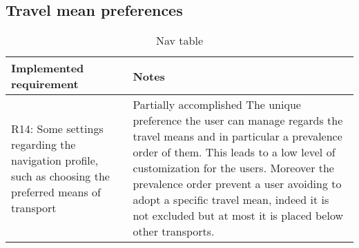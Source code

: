 \subsection{Travel mean preferences}

\begin{flushleft}
	
	\begin{table}[htp]
		
		\begin{tabular}{p{7cm}|p{7cm}}
			Implemented requirement&Notes\\
			\hline
			\hline
R14: Some settings regarding the navigation profile, such as choosing the preferred means of transport&\textcolor{BurntOrange}{Partially accomplished} The unique preference the user can manage regards the travel means and in particular a prevalence order of them. This leads to a low level of customization for the users. Moreover the prevalence order prevent a user avoiding to adopt a specific travel mean, indeed it is not excluded but at most it is placed below other transports.   \\
\hline

\end{tabular}

\caption{Nav table } 
\label{tab:Navtable}

\end{table}

\end{flushleft}